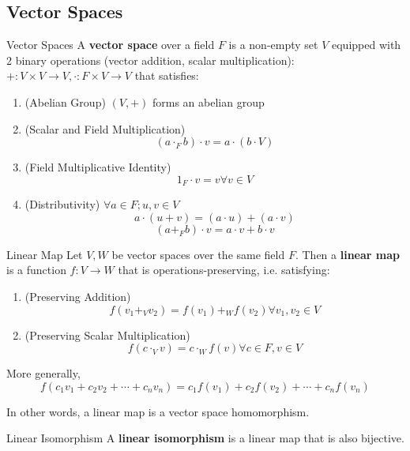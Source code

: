 \documentclass[a4paper, 10pt]{article}
\begin{document}
\subsection{Vector Spaces}
\begin{definition} {Vector Spaces}
    A \textbf{vector space} over a field \(F\) is a non-empty set \(V\) equipped with 2 binary operations (vector addition, scalar multiplication): \(+: V \times V \to V, \cdot: F \times V \to V\) that satisfies:
    \begin{enumerate}
        \item (Abelian Group) \((V, +)\) forms an abelian group
        \item (Scalar and Field Multiplication)  \[
                  (a \cdot_F b) \cdot v = a \cdot (b \cdot V)
              \]
        \item (Field Multiplicative Identity) \[
                  1_F \cdot v = v \forall v \in V
              \]
        \item (Distributivity) \(\forall a \in F; u, v \in V\)
              \[
                  a \cdot (u + v) = (a \cdot u ) + (a \cdot v)
              \]\[
                  (a +_F b) \cdot v = a \cdot v + b \cdot v
              \]
    \end{enumerate}
\end{definition}
\begin{definition} {Linear Map}
    Let \(V, W\) be vector spaces over the same field \(F\). Then a \textbf{linear map} is a function \(f: V \to W\) that is operations-preserving, i.e. satisfying:
    \begin{enumerate}
        \item (Preserving Addition) \[
                  f(v_1 +_V v_2) = f(v_1) +_W f(v_2) \forall v_1, v_2 \in V
              \]
        \item (Preserving Scalar Multiplication) \[
                  f(c \cdot_V v) = c \cdot_W f(v) \forall c \in F, v \in V
              \]
    \end{enumerate}
    More generally, \[
        f(c_1 v_1 + c_2 v_2 + \cdots + c_n v_n) = c_1 f(v_1) + c_2 f(v_2) + \cdots + c_n f(v_n)
    \]

    In other words, a linear map is a vector space homomorphism.
\end{definition}

\begin{definition} {Linear Isomorphism}
    A \textbf{linear isomorphism} is a linear map that is also bijective.
\end{definition}
\end{document}
